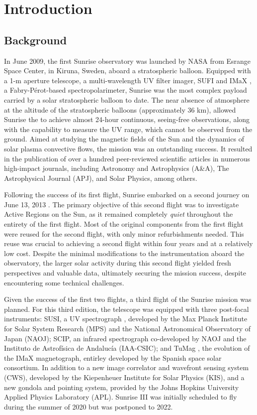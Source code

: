 \chapter{Introduction}

\section{Background}

In June 2009, the first Sunrise observatory \citep{SunriseI} was launched by NASA from Esrange Space Center, in Kiruna, Sweden, aboard a stratospheric balloon. Equipped with a 1-m aperture telescope, a multi-wavelength UV filter imager, SUFI \citep{SUFI} and IMaX \citep{IMaX}, a Fabry-Pérot-based spectropolarimeter, Sunrise was the most complex payload carried by a solar stratospheric balloon to date. The near absence of atmosphere at the altitude of the stratospheric balloons (approximately 36 km), allowed Sunrise the to achieve almost 24-hour continuous, seeing-free observations, along with the capability to measure the UV range, which cannot be observed from the ground. Aimed at studying the magnetic fields of the Sun and the dynamics of solar plasma convective flows, the mission was an outstanding success. It resulted in the publication of over a hundred peer-reviewed scientific articles in numerous high-impact journals, including Astronomy and Astrophysics (A\&A), The Astrophysical Journal (APJ), and Solar Physics, among others.

Following the success of its first flight, Sunrise embarked on a second journey  on June 13, 2013 \citep{SunriseII}. The primary objective of this second flight was to investigate Active Regions on the Sun, as it remained completely \textit{quiet} throughout the entirety of the first flight. Most of the original components from the first flight were reused for the second flight, with only minor refurbishments needed. This reuse was crucial to achieving a second flight within four years and at a relatively low cost. Despite the minimal modifications to the instrumentation aboard the observatory, the larger solar activity during this second flight yielded fresh perspectives and valuable data, ultimately securing the mission success, despite encountering some technical challenges.

Given the success of the first two flights, a third flight of the Sunrise mission was planned. For this third edition, the telescope was equipped with three post-focal instruments: SUSI, a UV spectrograph \citep{susi}, developed by the Max Planck Institute for Solar System Research (MPS) and the National Astronomical Observatory of Japan (NAOJ); SCIP, an infrared spectrograph \citep{SCIP} co-developed by NAOJ and the Instituto de Astrofísica de Andalucía (IAA-CSIC); and TuMag \citep{tumag}, the evolution of the IMaX magnetograph, entirley developed by the Spanish space solar consortium. In addition to a new image correlator and wavefront sensing system (CWS), developed by the Kiepenheuer Institute for Solar Physics (KIS), and a new gondola and pointing system, provided by the
Johns Hopkins University Applied Physics Laboratory (APL). Sunrise III was initially scheduled to fly during the summer of 2020 but was postponed to 2022.

